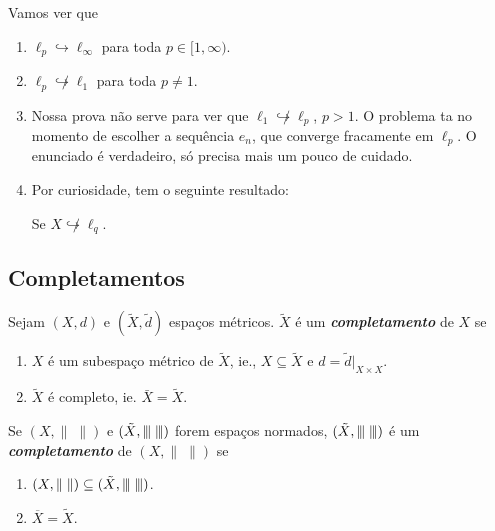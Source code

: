 \documentclass[portuguese]{article}
\theoremstyle{definition}
\newcommand{\vertiii}[1]{{\left\vert\kern-0.25ex\left\vert\kern-0.25ex\left\vert #1 
		\right\vert\kern-0.25ex\right\vert\kern-0.25ex\right\vert}}
\begin{document}
	\begin{obs}Vamos ver que
		\begin{enumerate}
			\item $\ell_p\hookrightarrow\ell_\infty$ para toda $p\in[1,\infty)$.
			\item $\ell_p\not\hookrightarrow\ell_1$ para toda $p\neq1$.
			\item Nossa prova não serve para ver que $\ell_1\not\hookrightarrow\ell_p$, $p>1$. O problema ta no momento de escolher a sequência $e_n$, que converge fracamente em $\ell_p$. O enunciado é verdadeiro, só precisa mais um pouco de cuidado.
			\item Por curiosidade, tem o seguinte resultado:
			\begin{teo}
				Se $X\not\hookrightarrow\ell_q$.
			\end{teo}
		\end{enumerate}
	\end{obs}
	
	\subsection{Completamentos}
	\begin{defn}
		Sejam $(X,d)$ e $(\tilde{X},\tilde{d})$ espaços métricos. $\tilde{X}$ é um \textbf{\textit{completamento}} de $X$ se
		\begin{enumerate}
			\item $X$ é um subespaço métrico de $\tilde{X}$, ie., $X\subseteq\tilde{X}$ e $d=\tilde{d}|_{X\times X}$.
			\item $\tilde{X}$ é completo, ie. $\bar{X}=\tilde{X}$.
		\end{enumerate}
		
		Se $(X,\|\;\|)$ e $(\tilde{X},\vertiii{\;})$ forem espaços normados, $(\tilde{X},\vertiii{\;})$ é um \textbf{\textit{completamento}} de $(X,\|\;\|)$ se
		\begin{enumerate}
			\item $(X,\|\;\|)\subseteq(\tilde{X},\vertiii{\;})$.
			\item $\overline{X}=\tilde{X}$.
		\end{enumerate}
	\end{defn}
	
\end{document}

